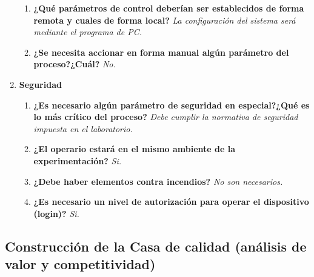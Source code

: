\begin{enumerate}
\begin{enumerate}
	  \item \textbf{ ¿Qué parámetros de control deberían ser establecidos de forma remota y cuales de forma local? }
		\subitem	\textit{ La configuración del sistema será mediante el programa de PC.
				}

	  \item \textbf{ ¿Se necesita accionar en forma manual algún parámetro del proceso?¿Cuál? }
		\subitem	\textit{ No.
				}

	\end{enumerate}
      
      \item \textbf{ Seguridad }
	\begin{enumerate}
	  \item \textbf{ ¿Es necesario algún parámetro de seguridad en especial?¿Qué es lo más crítico del proceso? }
		\subitem	\textit{ Debe cumplir la normativa de seguridad impuesta en el laboratorio.
				}

	  \item \textbf{ ¿El operario estará en el mismo ambiente de la experimentación? }
		\subitem	\textit{ Si.
				}

	  \item \textbf{ ¿Debe haber elementos contra incendios? }
		\subitem	\textit{ No son necesarios.
				}

	  \item \textbf{ ¿Es necesario un nivel de autorización para operar el dispositivo (login)? }
		\subitem	\textit{ Si.
				}

	\end{enumerate}
      
    \end{enumerate}


  \newpage


  \subsection{Construcción de la Casa de calidad (análisis de valor y competitividad)}  

  \newpage



